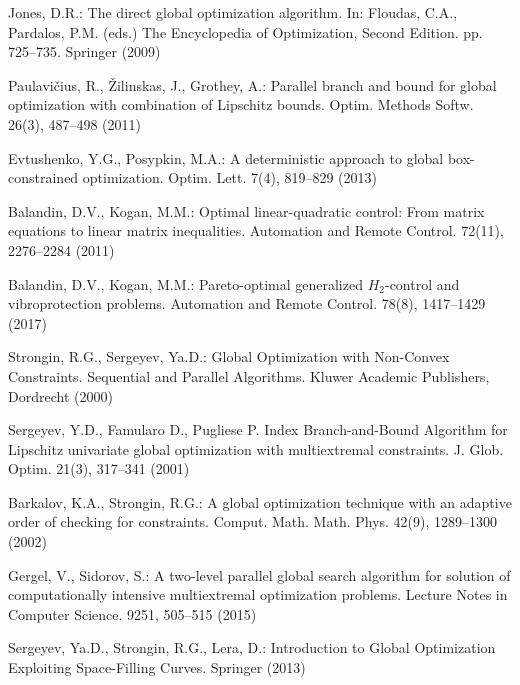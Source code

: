 \documentclass[smallextended]{svjour3}       %
\begin{document}
\begin{thebibliography}{}

Jones, D.R.: The direct global optimization algorithm. In: Floudas, C.A., Pardalos, P.M. (eds.) The Encyclopedia of Optimization, Second Edition. pp. 725--735. Springer (2009)


Paulavi\v cius, R., \v Zilinskas, J., Grothey, A.: Parallel branch and bound for global optimization with combination of Lipschitz bounds. Optim. Methods Softw. 26(3), 487--498 (2011)

Evtushenko, Y.G., Posypkin, M.A.: A deterministic approach to global box-constrained optimization. Optim. Lett. 7(4), 819--829 (2013)

Balandin, D.V., Kogan, M.M.: Optimal linear-quadratic control: From matrix equations to linear matrix inequalities. Automation and Remote Control. 72(11), 2276--2284 (2011)

Balandin, D.V., Kogan, M.M.: Pareto-optimal generalized $H_2$-control and vibroprotection problems. Automation and Remote Control. 78(8), 1417--1429 (2017)

Strongin, R.G., Sergeyev, Ya.D.: Global Optimization with Non-Convex Constraints. Sequential and Parallel Algorithms. Kluwer Academic Publishers, Dordrecht (2000)

Sergeyev, Y.D., Famularo D., Pugliese P. Index Branch-and-Bound Algorithm for Lipschitz univariate global optimization with multiextremal constraints. J. Glob. Optim. 21(3), 317--341 (2001) 

Barkalov, K.A., Strongin, R.G.: A global optimization technique with an adaptive order of checking for constraints. Comput. Math. Math. Phys. 42(9), 1289--1300 (2002)

Gergel, V., Sidorov, S.: A two-level parallel global search algorithm for solution of computationally intensive multiextremal optimization problems. Lecture Notes in Computer Science. 9251, 505--515 (2015)

Sergeyev, Ya.D., Strongin, R.G., Lera, D.: Introduction to Global Optimization Exploiting Space-Filling Curves. Springer (2013)


\end{thebibliography}
\end{document}
